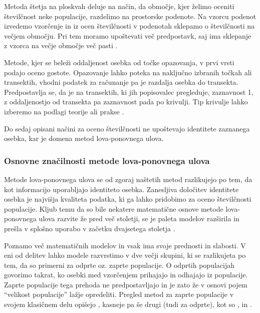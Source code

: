 Metoda štetja na ploskvah deluje na način, da območje, kjer želimo oceniti številčnost neke populacije, razdelimo na prostorske podenote. Na vzorcu podenot izvedemo vzorčenje in iz ocen številčnosti v podenotah sklepamo o številčnosti na večjem območju. Pri tem moramo upoštevati več predpostavk, saj ima sklepanje z vzorca na večje območje več pasti \citep{williams_analysis_2002}.

Metode, kjer se beleži oddaljenost osebka od točke opazovanja, v prvi vrsti podajo oceno gostote. Opazovanje lahko poteka na naključno izbranih točkah ali transektih, vhodni podatek za računanje pa je razdalja osebka do transekta. Predpostavlja se, da je na transektih, ki jih popisovalec pregleduje, zaznavnost 1, z oddaljenostjo od transekta pa zaznavnost pada po krivulji. Tip krivulje lahko izberemo na podlagi teorije ali prakse \citep{williams_analysis_2002}.

Do sedaj opisani načini za oceno številčnosti ne upoštevajo identitete zaznanega osebka, kar je domena metod lova-ponovnega ulova.

\subsubsection[\bfseries Osnovne značilnosti metode lova-ponovnega ulova]{Osnovne značilnosti metode lova-ponovnega ulova}
Metode lova-ponovnega ulova se od zgoraj naštetih metod razlikujejo po tem, da kot informacijo uporabljajo identiteto osebka. Zanesljiva določitev identitete osebka je najvišja kvaliteta podatka, ki ga lahko pridobimo za oceno številčnosti populacije. Kljub temu da so bile nekatere matematične osnove metode lova-ponovnega ulova razvite že pred več stoletji, se je paleta modelov razširila in prešla v splošno uporabo v začetku dvajsetega stoletja \citep{pollock_capture-recapture_2000}.

Poznamo več matematičnih modelov in vsak ima svoje prednosti in slabosti. V eni od delitev lahko modele razvrstimo v dve večji skupini, ki se razlikujeta po tem, da so primerni za odprte oz. zaprte populacije. O odprtih populacijah govorimo takrat, ko osebki med vzorčenjem prihajajo in odhajajo iz populacije. Zaprte populacije tega prehoda ne predpostavljajo in je zato že v osnovi pojem ``velikost populacije'' lažje opredeliti. Pregled metod za zaprte populacije v svojem klasičnem delu opišejo \citet{otis_statistical_1978}, kasneje pa še drugi (tudi za odprte), kot so \citet{white_capture-recapture_1982}, \citet{seber_review_1986} in \citet{white_program_1999}.

